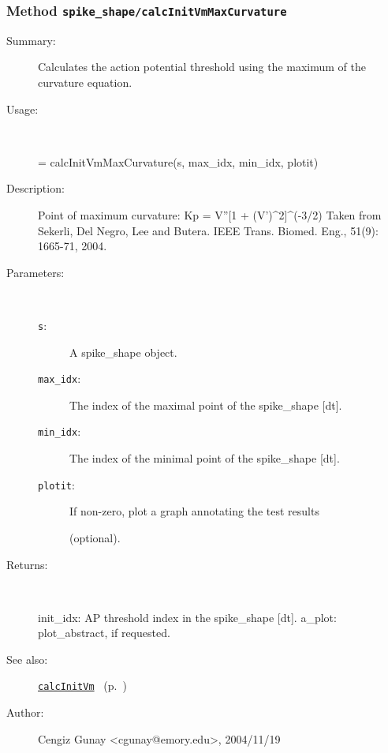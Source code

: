 \subsubsection[Method \texttt{calcInitVmMaxCurvature}]{Method \texttt{spike\_shape/calcInitVmMaxCurvature}}%
%
\label{ref_spike_shape__calcInitVmMaxCurvature}%
\hypertarget{ref_spike_shape__calcInitVmMaxCurvature}{}%
\begin{description}
\item[Summary:]Calculates the action potential threshold using the
			maximum of the curvature equation.
%
\item[Usage:]~%
\begin{lyxcode}%
[init\_idx, a\_plot] = calcInitVmMaxCurvature(s, max\_idx, min\_idx, plotit)
%
\end{lyxcode}%
%
\item[Description:]%
Point of maximum curvature: Kp = V''[1 + (V')\textasciicircum{}2]\textasciicircum{}(-3/2)
 Taken from Sekerli, Del Negro, Lee and Butera. 
 IEEE Trans. Biomed. Eng., 51(9): 1665-71, 2004.
\item[Parameters:]~
\begin{description}%
\item[\texttt{s}:]
 A spike\_shape object.
\item[\texttt{max\_idx}:]
 The index of the maximal point of the spike\_shape [dt].
\item[\texttt{min\_idx}:]
 The index of the minimal point of the spike\_shape [dt].
\item[\texttt{plotit}:]
 If non-zero, plot a graph annotating the test results 

(optional).
\end{description}%
%
\item[Returns:
]~

	init\_idx: AP threshold index in the spike\_shape [dt].
	a\_plot: plot\_abstract, if requested.
%
%
\item[See also:]%
\hyperlink{ref_calcInitVm}{\texttt{calcInitVm}}%
\ (p.~\pageref{ref_calcInitVm})%
%
%
\item[Author:]%
Cengiz Gunay <cgunay@emory.edu>, 2004/11/19
%
\end{description}
\methodline%
